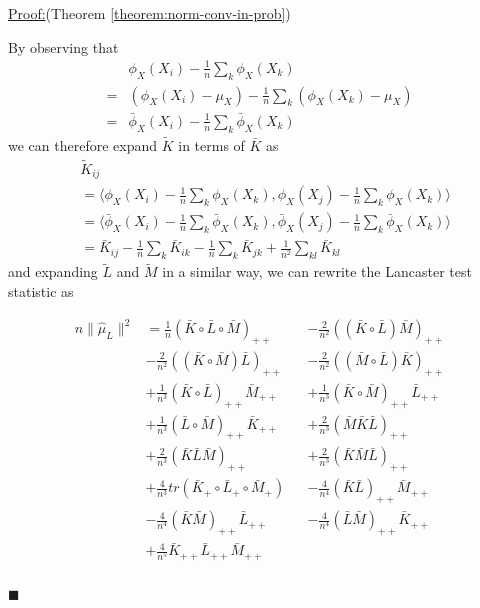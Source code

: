 \documentclass[]{article}
\newenvironment{claimproof}[1]{\par\noindent\underline{Proof:}\space#1}{\hfill $\blacksquare$}
\begin{document}
\begin{claimproof}(Theorem \ref{theorem:norm-conv-in-prob})

By observing that
\begin{align*}
& \phi_X(X_i)- \frac{1}{n}\sum_k\phi_X(X_k) \\
= &  (\phi_X(X_i) - \mu_X) - \frac{1}{n}\sum_k (\phi_X(X_k) - \mu_X)\\
= &\bar\phi_X(X_i)- \frac{1}{n}\sum_k\bar\phi_X(X_k)
\end{align*}
we can therefore expand $\tilde{K}$ in terms of $\bar{K}$ as
\begin{align*}
&\tilde{K}_{ij} \\ 
&= \langle\phi_X(X_i)- \frac{1}{n}\sum_k\phi_X(X_k),\phi_X(X_j) - \frac{1}{n}\sum_k\phi_X(X_k)\rangle \\
&= \langle\bar\phi_X(X_i)- \frac{1}{n}\sum_k\bar\phi_X(X_k),\bar\phi_X(X_j) - \frac{1}{n}\sum_k\bar\phi_X(X_k)\rangle \\
&= \bar{K}_{ij} - \frac{1}{n}\sum_k\bar{K}_{ik} - \frac{1}{n}\sum_k\bar{K}_{jk} + \frac{1}{n^2}\sum_{kl}\bar{K}_{kl}
\end{align*}
and expanding $\tilde{L}$ and $\tilde{M}$ in a similar way, we can rewrite the Lancaster test statistic as

\begin{align*} 
n\|\hat \mu_L\|^2 &= 
\frac{1}{n}(\bar{K} \circ \bar{L}\circ \bar{M})_{++} &&-
\frac{2}{n^2}((\bar{K}\circ \bar{L}) \bar{M})_{++} \\&- 
\frac{2}{n^2}((\bar{K} \circ \bar{M}) \bar{L})_{++} &&- 
\frac{2}{n^2}((\bar{M} \circ \bar{L}) \bar{K})_{++} \\&+ 
\frac{1}{n^3}(\bar{K} \circ \bar{L})_{++} \bar{M}_{++} &&+ 
\frac{1}{n^3}(\bar{K} \circ \bar{M})_{++} \bar{L}_{++} \\&+ 
\frac{1}{n^3}(\bar{L} \circ \bar{M})_{++} \bar{K}_{++} &&+ 
\frac{2}{n^3}(\bar{M}\bar{K}\bar{L})_{++} \\&+ 
\frac{2}{n^3}(\bar{K}\bar{L}\bar{M})_{++} &&+ 
\frac{2}{n^3}(\bar{K}\bar{M}\bar{L})_{++} \\&+ 
\frac{4}{n^3}tr(\bar{K}_+ \circ \bar{L}_+ \circ \bar{M}_+) &&-
\frac{4}{n^4}(\bar{K} \bar{L})_{++} \bar{M}_{++} \\& - 
\frac{4}{n^4}(\bar{K}\bar{M})_{++}\bar{L}_{++} &&- 
\frac{4}{n^4}(\bar{L}\bar{M})_{++} \bar{K}_{++} \\&+
\frac{4}{n^5}\bar{K}_{++} \bar{L}_{++} \bar{M}_{++} \\
\end{align*}


\end{claimproof}
\end{document}
